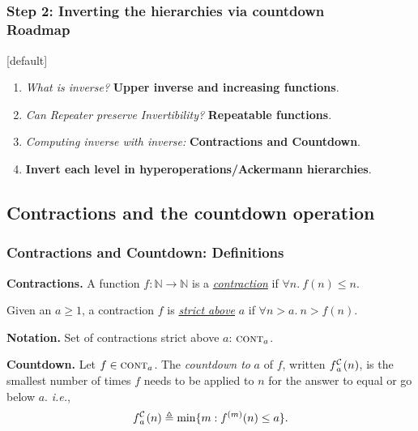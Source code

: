 \subsection*{}
\begin{frame}
\frametitle{Step 2: Inverting the hierarchies via countdown\\ Roadmap}
[default]

\begin{enumerate}[\bfseries 1.]
	\itemsep 3ex
	\item<done@1->
	\emph{What is inverse?} \textbf{Upper inverse and increasing functions}.
	
	\item<done@1->
	\emph{Can Repeater preserve Invertibility?} \textbf{Repeatable functions}.
	
	\item<come@2->
	\emph{Computing inverse with inverse:} \textbf{Contractions and Countdown}.
	
	\item
	\textbf{Invert each level in hyperoperations/Ackermann hierarchies}.
\end{enumerate}
\end{frame}


\subsection{Contractions and the countdown operation}


\begin{frame}
\frametitle{Contractions and Countdown: Definitions}
\textbf{Contractions.} A function $f : \mathbb{N} \to \mathbb{N}$ is a
\href{https://github.com/inv-ack/inv-ack/blob/7270e64a2600b771f2b1b1b151f7d13fb2ae6c97/countdown.v\#L40-L42}{\emph{contraction}} if $\forall n.~ f(n) \le n$.

Given an $a \ge 1$, a contraction $f$ is
\href{https://github.com/inv-ack/inv-ack/blob/7270e64a2600b771f2b1b1b151f7d13fb2ae6c97/countdown.v\#L44-L46}{\emph{strict above}} $a$ if $\forall n > a.~n > f(n)$.

\bigskip

\textbf{Notation.} Set of contractions strict above $a$: $\text{\scshape{cont}}_a$.

\bigskip

\textbf{Countdown.} Let $f\in \text{\scshape{cont}}_a$. The \textit{countdown to} $a$ of $f$, written
$\cdt{f}{a}(n)$, is the smallest number of times $f$ needs to be applied to
$n$ for the answer to equal or go below $a$. \emph{i.e.},
\begin{equation*}
\cdt{f}{a}(n) \triangleq \min\{m: f^{(m)}(n)\le a \}.
\end{equation*}
\end{frame}


